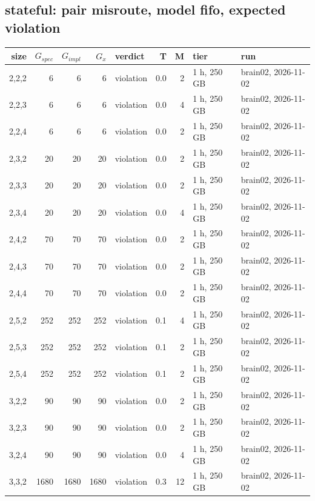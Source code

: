 \documentclass[10pt]{article}
\begin{document}
\subsection*{stateful: pair \textsf{misroute}, model fifo, expected violation}
\begin{longtable}{@{}rrrrlrrll@{}}
\toprule
size & $G_{\mathit{spec}}$ & $G_{\mathit{impl}}$ & $G_x$ & verdict & T & M & tier & run \\
\midrule
\endhead
\color{blue} 2,2,2 & 6 & 6 & 6 & violation & 0.0 & 2 & 1 h, 250 GB & brain02, 2026-11-02 \\
\color{blue} 2,2,3 & 6 & 6 & 6 & violation & 0.0 & 4 & 1 h, 250 GB & brain02, 2026-11-02 \\
\color{blue} 2,2,4 & 6 & 6 & 6 & violation & 0.0 & 2 & 1 h, 250 GB & brain02, 2026-11-02 \\
\color{blue} 2,3,2 & 20 & 20 & 20 & violation & 0.0 & 2 & 1 h, 250 GB & brain02, 2026-11-02 \\
\color{blue} 2,3,3 & 20 & 20 & 20 & violation & 0.0 & 2 & 1 h, 250 GB & brain02, 2026-11-02 \\
\color{blue} 2,3,4 & 20 & 20 & 20 & violation & 0.0 & 4 & 1 h, 250 GB & brain02, 2026-11-02 \\
\color{blue} 2,4,2 & 70 & 70 & 70 & violation & 0.0 & 2 & 1 h, 250 GB & brain02, 2026-11-02 \\
\color{blue} 2,4,3 & 70 & 70 & 70 & violation & 0.0 & 2 & 1 h, 250 GB & brain02, 2026-11-02 \\
\color{blue} 2,4,4 & 70 & 70 & 70 & violation & 0.0 & 2 & 1 h, 250 GB & brain02, 2026-11-02 \\
\color{blue} 2,5,2 & 252 & 252 & 252 & violation & 0.1 & 4 & 1 h, 250 GB & brain02, 2026-11-02 \\
\color{blue} 2,5,3 & 252 & 252 & 252 & violation & 0.1 & 2 & 1 h, 250 GB & brain02, 2026-11-02 \\
\color{blue} 2,5,4 & 252 & 252 & 252 & violation & 0.1 & 2 & 1 h, 250 GB & brain02, 2026-11-02 \\
\color{blue} 3,2,2 & 90 & 90 & 90 & violation & 0.0 & 2 & 1 h, 250 GB & brain02, 2026-11-02 \\
\color{blue} 3,2,3 & 90 & 90 & 90 & violation & 0.0 & 2 & 1 h, 250 GB & brain02, 2026-11-02 \\
\color{blue} 3,2,4 & 90 & 90 & 90 & violation & 0.0 & 4 & 1 h, 250 GB & brain02, 2026-11-02 \\
\color{blue} 3,3,2 & 1680 & 1680 & 1680 & violation & 0.3 & 12 & 1 h, 250 GB & brain02, 2026-11-02 \\

\end{longtable}
\end{document}
